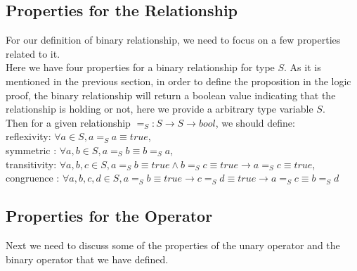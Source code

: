 \documentclass[a4paper,12pt,twoside,openright]{report}
\begin{document}
\subsection{Properties for the Relationship}
For our definition of binary relationship, we need to focus on a few properties related to it.\\
Here we have four properties for a binary relationship for type $S$. As it is mentioned in the previous section, in order to define the proposition in the logic proof, the binary relationship will return a boolean value indicating that the relationship is holding or not, here we provide a arbitrary type variable $S$.\\
Then for a given relationship $=_S : S \rightarrow S \rightarrow bool$, we should define:\\
reflexivity: $\forall a \in S, a =_S a \equiv true$,\\
symmetric : $\forall a, b \in S, a =_S b \equiv b =_S a$, \\
transitivity: $\forall a,b,c \in S, a =_S b \equiv true \wedge b =_S c \equiv true \rightarrow a =_S c \equiv true$, \\
congruence : $\forall a,b,c,d \in S, a =_S b \equiv true \rightarrow c =_S d \equiv true \rightarrow a =_S c \equiv b = _S d$
\subsection{Properties for the Operator}
Next we need to discuss some of the properties of the unary operator and the binary operator that we have defined.
\end{document}
